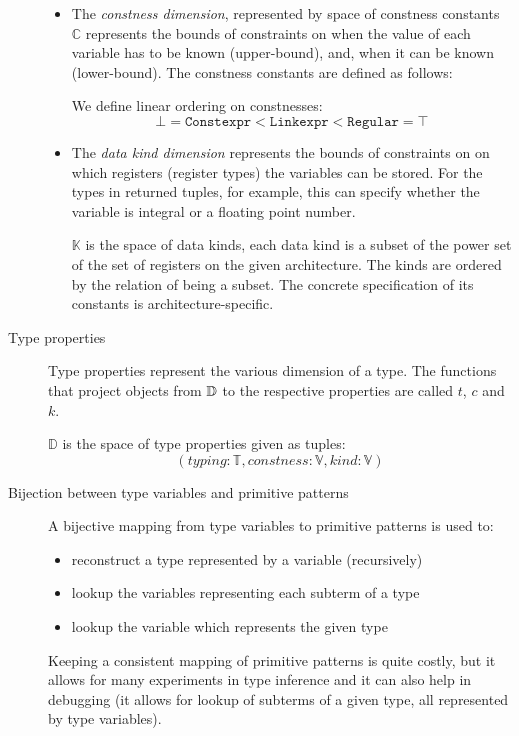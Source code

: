\begin{description}
    \begin{itemize}
        \item  The \emph{constness dimension}, represented by space of constness constants $\mathbb{C}$ represents the bounds of constraints on when the value of each variable has to be known (upper-bound), and, when it can be known (lower-bound). The constness constants are defined as follows:

\begin{center}\begin{grammar}
\end{grammar}\end{center}

        We define linear ordering on constnesses:
        $$\bot = \mathtt{Constexpr} < \mathtt{Linkexpr} < \mathtt{Regular} = \top$$

        \item The \emph{data kind dimension} represents the bounds of constraints on on which registers (register types) the variables can be stored. For the types in returned tuples, for example, this can specify whether the variable is integral or a floating point number.

        $\mathbb{K}$ is the space of data kinds, each data kind is a subset of the power set of the set of registers on the given architecture. The kinds are ordered by the relation of being a subset. The concrete specification of its constants is architecture-specific.
    \end{itemize}

    \item[Type properties] Type properties represent the various dimension of a type. The functions that project objects from $\mathbb{D}$ to the respective properties are called $t$, $c$ and $k$.

    $\mathbb{D}$ is the space of type properties given as tuples:
    $$(typing: \mathbb{T}, constness: \mathbb{V}, kind: \mathbb{V})$$


    \item[Bijection between type variables and primitive patterns]
    A bijective mapping from type variables to primitive patterns is used to:

    \begin{itemize}
        \item reconstruct a type represented by a variable (recursively)
        \item lookup the variables representing each subterm of a type
        \item lookup the variable which represents the given type
    \end{itemize}

    Keeping a consistent mapping of primitive patterns is quite costly, but it allows for many experiments in type inference and it can also help in debugging (it allows for lookup of subterms of a given type, all represented by type variables).
\end{description}

